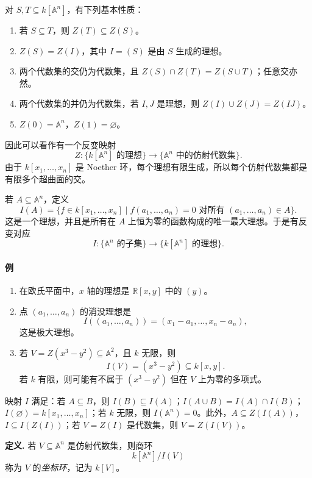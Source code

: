对 $S,T\subseteq k[\mathbb A^n]$，有下列基本性质：
\begin{enumerate}[label=(\arabic*)]
	\item 若 $S\subseteq T$，则 $Z(T)\subseteq Z(S)$。
	\item $Z(S)=Z(I)$，其中 $I=(S)$ 是由 $S$ 生成的理想。
	\item 两个代数集的交仍为代数集，且 $Z(S)\cap Z(T)=Z(S\cup T)$；任意交亦然。
	\item 两个代数集的并仍为代数集，若 $I,J$ 是理想，则 $Z(I)\cup Z(J)=Z(IJ)$。
	\item $Z(0)=\mathbb A^n$，$Z(1)=\varnothing$。
\end{enumerate}

因此可以看作有一个反变映射
\[
Z:\{k[\mathbb A^n]\text{ 的理想}\}\longrightarrow\{\mathbb A^n\text{ 中的仿射代数集}\}.
\]
由于 $k[x_1,\ldots,x_n]$ 是 Noether 环，每个理想有限生成，所以每个仿射代数集都是有限多个超曲面的交。

若 $A\subseteq\mathbb A^n$，定义
\[
I(A)=\{f\in k[x_1,\ldots,x_n]\mid f(a_1,\ldots,a_n)=0\text{ 对所有 }(a_1,\ldots,a_n)\in A\}.
\]
这是一个理想，并且是所有在 $A$ 上恒为零的函数构成的唯一最大理想。于是有反变对应
\[
I:\{\mathbb A^n\text{ 的子集}\}\longrightarrow\{k[\mathbb A^n]\text{ 的理想}\}.
\]

\paragraph{例}
\begin{enumerate}[label=(\arabic*)]
	\item 在欧氏平面中，$x$ 轴的理想是 $\mathbb R[x,y]$ 中的 $(y)$。
	\item 点 $(a_1,
	\ldots,a_n)$ 的消没理想是
	\[
	I((a_1,
	\ldots,a_n))=(x_1-a_1,
	\ldots,x_n-a_n),
	\]
	这是极大理想。
	\item 若 $V=Z(x^3-y^2)\subseteq\mathbb A^2$，且 $k$ 无限，则
	\[
	I(V)=(x^3-y^2)\subseteq k[x,y].
	\]
	若 $k$ 有限，则可能有不属于 $(x^3-y^2)$ 但在 $V$ 上为零的多项式。
\end{enumerate}

映射 $I$ 满足：若 $A\subseteq B$，则 $I(B)\subseteq I(A)$；$I(A\cup B)=I(A)\cap I(B)$；$I(\varnothing)=k[x_1,\ldots,x_n]$；若 $k$ 无限，则 $I(\mathbb A^n)=0$。此外，$A\subseteq Z(I(A))$，$I\subseteq I(Z(I))$；若 $V=Z(I)$ 是代数集，则 $V=Z(I(V))$。

\noindent\textbf{定义.} 若 $V\subseteq\mathbb A^n$ 是仿射代数集，则商环
\[
k[\mathbb A^n]/I(V)
\]
称为 $V$ 的\emph{坐标环}，记为 $k[V]$。

